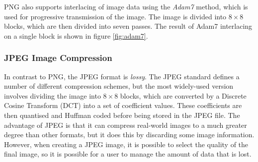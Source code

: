 PNG also supports interlacing of image data using the {\it Adam7} method, which is used for progressive transmission of the image. The image is divided into $8\times8$ blocks, which are then divided into seven passes. The result of Adam7 interlacing on a single block is shown in figure \ref{fig:adam7}.

\subsubsection{JPEG Image Compression}

In contrast to PNG, the JPEG format is {\it lossy}. The JPEG standard defines a number of different compression schemes, but the most widely-used version involves dividing the image into $8\times8$ blocks, which are converted by a Discrete Cosine Transform (DCT) into a set of coefficient values. These coefficients are then quantised and Huffman coded before being stored in the JPEG file. The advantage of JPEG is that it can compress real-world images to a much greater degree than other formats, but it does this by discarding some image information. However, when creating a JPEG image, it is possible to select the quality of the final image, so it is possible for a user to manage the amount of data that is lost.  

